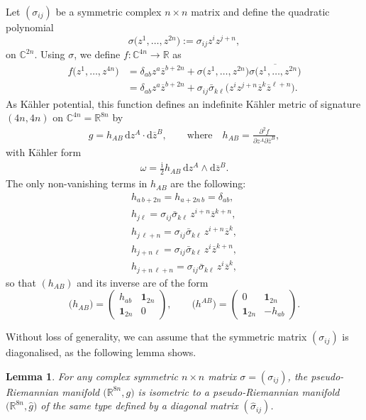 \documentclass[pdftex]{sigma}
\numberwithin{equation}{section}
\newtheorem{Lemma}[Theorem]{Lemma}
\newcommand{\C}{\ensuremath{\mathbb{C}}}
\newcommand{\1}{\mathbf{1}}
\renewcommand{\d}{{\mathrm d}}
\newcommand{\ol}{\overline}
\newcommand{\rr}{\mathbb{R}}
\newcommand{\+}{\oplus}
\renewcommand{\=}{\equiv}
\newcommand{\R}{\mathbb{R}}
\begin{document}
Let $(\sigma_{ij})$ be a symmetric complex $n\times n$ matrix and define the quadratic polynomial
\[\sigma\bigl(z^1,\ldots, z^{2n}\bigr):= \sigma_{ij}z^{i}z^{j+n},\]
on $\C^{2n}$.
Using $\sigma$, we define
 $f \colon \C^{4n}\to \rr$ as
\begin{align}
f\bigl(z^1,\ldots , z^{4n}\bigr)
&{}=
\delta_{ab} z^a\ol{z}^{b+2n}+
\sigma\bigl(z^1,\ldots, z^{2n}\bigr)\overline{\sigma\bigl(z^1,\ldots, z^{2n}\bigr)}
\nonumber\\
&{}=
\delta_{ab} z^a\ol{z}^{b+2n}
+
\sigma_{ij}\bar{\sigma}_{k\ell}\bigl(
 z^{i}z^{j+n}\ol{z}^{k} \ol{z}^{\ell+n}\bigr).\label{potential}
\end{align}
As K\"{a}hler potential, this function defines an indefinite K\"ahler metric of signature $(4n,4n)$ on $\C^{4n}=\rr^{8n}$ by
\begin{gather}\label{metric}
g= h_{AB} \,
 \d z^A \cdot \d \ol{z}^B,\qquad \text{where} \quad h_{AB}=\frac{\partial^2 f}{\partial z^A\partial \ol{z}^B},
 \end{gather}
with K\"{a}hler form
 \begin{align*}
\omega
=
\frac{\mathrm{i}}{2} h_{AB}\,
 \d z^A \wedge \d \ol{z}^B.
\end{align*}
The only non-vanishing terms in $h_{AB}$ are the following:
\begin{gather}
h_{a\, b+2n} = h_{a+2n\, b} = \delta_{ab},
\nonumber\\
h_{j\ell} =
\sigma_{ij}\bar{\sigma}_{k\ell}\,
 z^{i+n}\ol{z}^{k+n},
\nonumber\\
h_{j\, \ell+n} =
\sigma_{ij}\bar{\sigma}_{k\ell}\,
 z^{i+n}\ol{z}^{k},
\nonumber\\
h_{j+n\,\ell} =
\sigma_{ij}\bar{\sigma}_{k\ell}\,
 z^{i}\ol{z}^{k+n},
\nonumber\\
h_{j+n\, \ell+n} =
\sigma_{ij}\bar{\sigma}_{k\ell}\,
 z^{i}\ol{z}^{k},
\label{metriccoeff}
\end{gather}
so that {$(h_{AB})$} and its inverse are of the form
\[
{\bigl(h_{AB}\bigr)}=\begin{pmatrix} h_{ab} &\1_{2n} \\ \1_{2n} & 0\end{pmatrix},
\qquad
{\bigl(h^{AB}\bigr)}=\begin{pmatrix} 0 &\1_{2n} \\ \1_{2n} & -h_{ab}\end{pmatrix}.
\]

Without loss of generality, we can assume that the symmetric matrix {$(\sigma_{ij})$} is diagonalised, as the following lemma shows.
\begin{Lemma}\label{diag:lem}
For any complex symmetric $n\times n$ matrix $\sigma=(\sigma_{ij})$, the pseudo-Riemannian manifold $\bigl(\R^{8n},g\bigr)$ is isometric to a pseudo-Riemannian manifold $\bigl(\R^{8n},\hat g\bigr)$ of the same type defined by a diagonal matrix $(\hat\sigma_{ij})$.
\end{Lemma}
\end{document}
